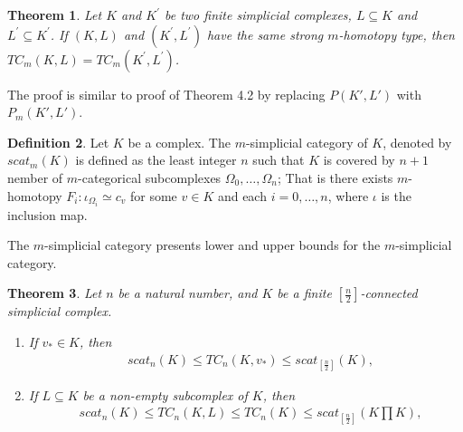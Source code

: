 \documentclass[preprint,11pt %
]{hjm1}
\newtheorem{theorem}{Theorem}[section]
\theoremstyle{definition}
\newtheorem{definition}[theorem]{Definition}
\begin{document}
\begin{theorem}%
Let $K$ and $K^{'}$ be two finite simplicial complexes, $L\subseteq K$ and $L^{'}\subseteq K^{'}$. If $(K,L)$ and $(K^{'},L^{'})$ have the same strong $m$-homotopy type, then $TC_m (K,L)=TC_m (K^{'},L^{'})$.
\end{theorem}

The proof is similar to proof of Theorem  4.2 by replacing $P(K',L')$ with $P_m(K',L')$.

\begin{definition}
Let $K$ be a complex. The $m$-simplicial category of $K$, denoted by $scat_m(K)$ is defined as the least integer $n$ such that $K$ is covered by $n +1$ nember of $m$-categorical subcomplexes $\Omega_0, \ldots, \Omega_n$; That is there exists $m$-homotopy $F_i : \iota_{\Omega_i} \simeq c_v$ for some $v \in K$ and each $i =0, \ldots, n$, where $\iota$ is the inclusion map.
\end{definition}


The $m$-simplicial category presents lower and upper bounds for the $m$-simplicial category.
 
\begin{theorem}
Let $n$ be a natural number, and $K$ be a finite $[\frac{n}{2}]$-connected simplicial complex.
\begin{enumerate}
\item
If  $v_* \in K$, then
\begin{align}
& scat_{n } (K) \le TC_{n} (K,v_*) \le scat_{[\frac{n}{2}]} (K), \label{eqnw1}
\end{align}


\item
If $L\subseteq K$ be a non-empty subcomplex of $K$, then 
\begin{align}
& scat_{n}(K)\leq TC_{n}(K,L) \le TC_{n}(K) \leq scat_{[\frac{n}{2}]}(K\prod K), \label{eqnw3}
\end{align}


\end{enumerate}
\end{theorem}
\end{document}
